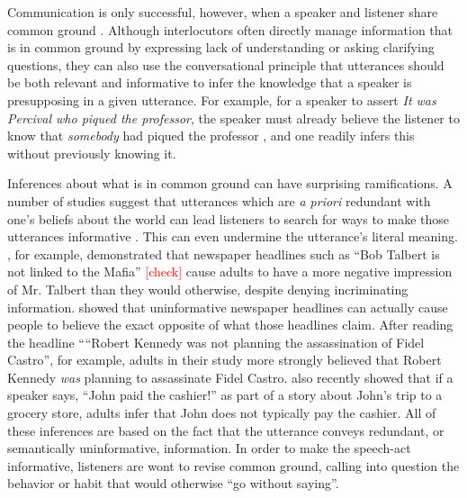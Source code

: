 \documentclass[10pt,letterpaper]{article}
\newcommand{\red}[1]{\textcolor{Red}{#1}}
\begin{document}

Communication is only successful, however, when a speaker and listener share common ground \cite{Clark1996}.
Although interlocutors often directly manage information that is in common ground by  expressing lack of understanding or asking clarifying questions, they can also use the conversational principle that utterances should be both relevant and informative \cite{Grice1975} to infer the knowledge that a speaker is presupposing in a given utterance.
For example, for a speaker to assert \emph{It was Percival who piqued the professor}, the speaker must already believe the listener to know that \emph{somebody} had piqued the professor \cite{Clark1977}, and one readily infers this without previously knowing it. 

Inferences about what is in common ground can have surprising ramifications.
A number of studies suggest that utterances which are \emph{a priori} redundant with one's beliefs about the world can lead listeners to search for ways to make those utterances informative \cite{Yandell1979, Wegner1981, Gruenfeld1992, Kravtchenko2015, Degen2015}.  
This can even undermine the utterance's literal meaning.  
, for example, demonstrated that newspaper headlines such as ``Bob Talbert is not linked to the Mafia'' \red{[check]} cause adults to have a more negative impression of Mr. Talbert than they would otherwise, despite denying incriminating information.  
 showed that uninformative newspaper headlines can actually cause people to believe the exact opposite of what those headlines claim.  
After reading the headline ``“Robert Kennedy was not planning the assassination of Fidel Castro'', for example, adults in their study more strongly believed that Robert Kennedy \emph{was} planning to assassinate Fidel Castro.
 also recently showed that if a speaker says, ``John paid the cashier!'' as part of a story about John's trip to a grocery store, adults infer that John does not typically pay the cashier.  
All of these inferences are based on the fact that the utterance conveys redundant, or semantically uninformative, information.
In order to make the speech-act informative, listeners are wont to revise common ground, calling into question the behavior or habit that would otherwise ``go without saying''.
\end{document}
